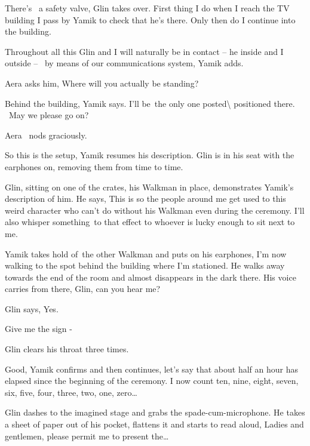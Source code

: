 \documentclass[12pt]{book}
\begin{document}
{\textquotedbl}There's ~a safety valve,{\textquotedbl} Glin takes over. {\textquotedbl}First thing I do when I reach the
TV building I pass by Yamik to check that he's there. Only then do I continue into the building.{\textquotedbl}

{\textquotedbl}Throughout all this Glin and I will naturally be in contact -- he inside and I outside -- \ by means of
our communications system,{\textquotedbl} Yamik adds.

Aera asks him, {\textquotedbl}Where will you actually be standing?{\textquotedbl}

{\textquotedbl}Behind the building,{\textquotedbl} Yamik says. {\textquotedbl}I'll be~the only one
posted{\textbackslash} positioned there.{ \ }May we please go
on?{\textbar}{\textquotedbl}

Aera \ nods graciously.

{\textquotedbl}So this is the setup,{\textquotedbl} Yamik resumes his description. {\textquotedbl}Glin is in his seat
with the earphones on, removing them from time to time.{\textquotedbl}

Glin, sitting on one of the crates, his Walkman in place, demonstrates Yamik's description of him. He says,
{\textquotedbl}This is so the{ }people around me get used to this weird
character who can't do without his Walkman even during the ceremony. I'll also whisper something~to that effect to
whoever is lucky enough to sit next to me.{\textquotedbl}

Yamik takes hold of~the other Walkman and puts on his earphones, {\textquotedbl}I'm now walking to the spot behind the
building where I'm stationed.{\textquotedbl} He walks away towards the end of the room and almost disappears in the
dark there. His voice carries from there, {\textquotedbl}Glin, can you hear me?{\textquotedbl}

Glin says, {\textquotedbl}Yes.{\textquotedbl}

{\textquotedbl}Give me the sign -{\textquotedbl}

Glin clears his throat three times.

{\textquotedbl}Good,{\textquotedbl} Yamik confirms and then continues, {\textquotedbl}let's say that about half an hour
has elapsed since the beginning of the ceremony. I now count ten, nine, eight, seven, six, five, four, three, two, one,
zero{\dots}{\textquotedbl}

Glin dashes to the imagined stage and grabs the{ }spade-cum-microphone. He takes a sheet of paper out of
his pocket, flattens it and starts to read aloud, {\textquotedbl}Ladies and gentlemen, please permit me to present
the{\dots} {\textquotedbl}
\end{document}
